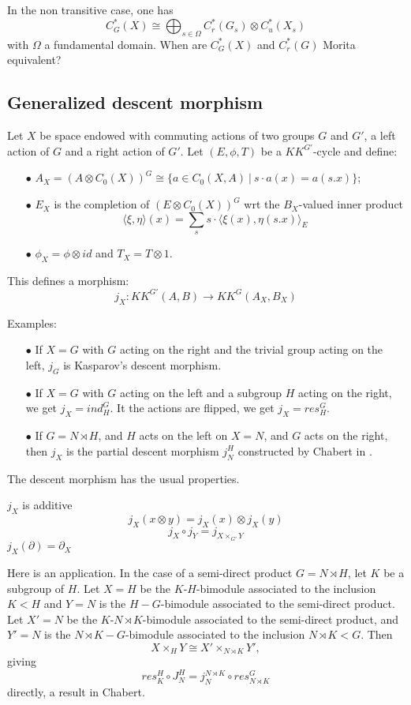 In the non  transitive case, one has
\[ C^*_G(X) \cong \bigoplus_{s\in \Omega} C_r^*(G_s) \otimes C^*_u(X_s)\]
with $\Omega$ a fundamental domain. When are $C_G^*(X)$ and $C^*_r(G)$ Morita equivalent?

\subsection{Generalized descent morphism}

Let $X$ be space endowed with commuting actions of two groups $G$ and $G'$, a left action of $G$ and a right action of $G'$. Let $(E,\phi, T)$ be a $KK^{G'}$-cycle and define:
\begin{itemize}
\item[$\bullet$] $A_X = (A\otimes C_0(X))^G \cong \{a \in C_0(X,A) \ | \ s\cdot a(x) = a(s.x)\}$;
\item[$\bullet$] $E_X$ is the completion of $(E\otimes C_0(X))^G$ wrt the $B_X$-valued inner product
\[ \langle \xi , \eta  \rangle (x) =\sum_s s\cdot \langle \xi(x) , \eta (s.x) \rangle_E\]
\item[$\bullet$] $\phi_X = \phi \otimes id $ and $T_X = T\otimes 1$.  
\end{itemize}

This defines a morphism:
\[ j_X: KK^{G'}(A,B) \rightarrow  KK^{G}(A_X,B_X) \]

Examples:
\begin{itemize}
\item[$\bullet$] If $X=G$ with $G$ acting on the right and the trivial group acting on the left, $j_G$ is Kasparov's descent morphism.
\item[$\bullet$] If $X=G$ with $G$ acting on the left and a subgroup $H$ acting on the right, we get $j_X=  ind_H^G$. It the actions are flipped, we get $j_X= res_H^G$.
\item[$\bullet$] If $G = N\rtimes H$, and $H$ acts on the left on $X=N$, and $G$ acts on the right, then $j_X$ is the partial descent morphism $j_N^H$ constructed by Chabert in \cite{}. 
\end{itemize}

The descent morphism has the usual properties.
\begin{prop}
$j_X$ is additive
\[j_X(x\otimes y ) = j_X(x)\otimes j_X(y)\]
\[j_X \circ j_Y = j_{X\times_{G'} Y} \]
$j_X(\partial ) =\partial_X$
\end{prop}

Here is an application. In the case of a semi-direct product $G = N\rtimes H$, let $K$ be a subgroup of $H$. Let $X=H$ be the $K$-$H$-bimodule associated to the inclusion $K<H$ and $Y = N$ is the $H-G$-bimodule associated to the semi-direct product. Let $X'=N$ be the $K$-$N\rtimes K$-bimodule associated to the semi-direct product, and $Y' = N$ is the $N\rtimes K-G$-bimodule associated to the inclusion $N\rtimes K < G$. Then 
\[ X\times_{H} Y \cong X'\times_{N\rtimes K} Y',\]
giving 
\[res_{K}^H \circ J_N^H = j_N^{N\rtimes K} \circ res_{N\rtimes K}^G\]
directly, a result in Chabert.\\

